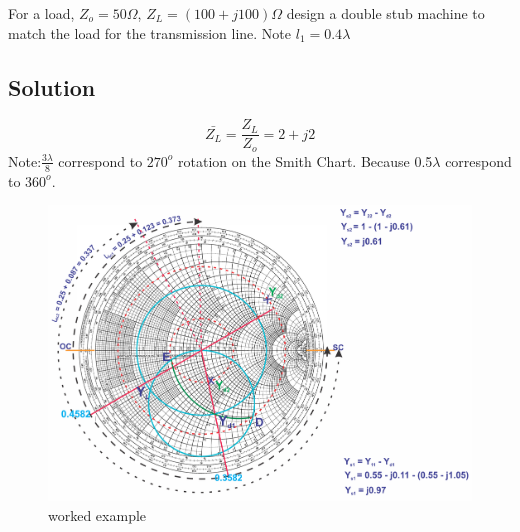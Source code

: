 \begin{exmp}
For a load, $Z_{o} = 50\Omega$, $Z_{L} = (100 + j100)\Omega$ design a double stub machine to match the load for the transmission line. Note $l_{1} = 0.4\lambda$
\subsection*{Solution}
$$\bar{Z_{L}} = \frac{Z_{L}}{Z_{o}} = 2 + j2$$
Note:$\frac{3\lambda}{8}$ correspond to $270^{o} $ rotation on the Smith Chart. Because 0.5$\lambda$ correspond to $ 360^{o}$. 
\begin{figure}[h]
\centering
\includegraphics[width=1\linewidth]{./graphics/question1}
\caption{worked example}
\end{figure}
				

\end{exmp}
